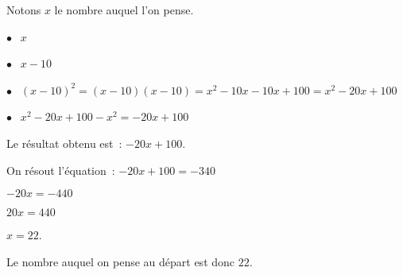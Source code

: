 
\medskip

%
Notons $x$ le nombre auquel l'on pense.

$\bullet~~$	$x$

$\bullet~~$	$x - 10$

$\bullet~~$	$(x - 10)^2 = (x - 10)(x - 10) = x^2 - 10x - 10x + 100 = x^2 - 20x + 100$

$\bullet~~$	$x^2 - 20x + 100 - x^2 = - 20x + 100$

Le résultat obtenu est : $- 20x + 100$.

On résout l'équation :	$- 20x + 100	=	- 340$

				$- 20x	=	-440$
				
				$20x	=	440$
				
				$x	=	22$.
				
Le nombre auquel on pense au départ est donc $22$.
\vspace{0,5cm}

